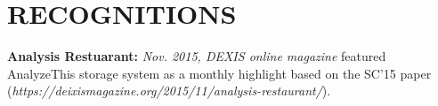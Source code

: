 \section{RECOGNITIONS}
\vspace{0.03in}

{\bf Analysis Restuarant:} \emph{Nov. 2015, DEXIS online magazine} featured
AnalyzeThis storage system as a monthly highlight based on the SC'15 paper
{\small(\emph{https://deixismagazine.org/2015/11/analysis-restaurant/})}.

